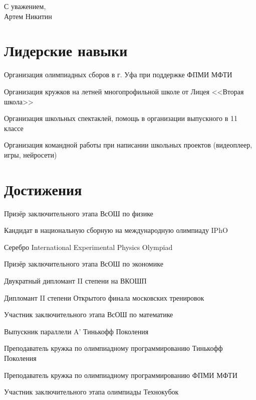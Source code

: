 \begin{flushright}
    С уважением, \\
    Артем Никитин
\end{flushright}


\section{\textbf{Лидерские навыки}}
\resumeSubHeadingListStart

\resumePOR
{}{Организация олимпиадных сборов в г. Уфа при поддержке ФПМИ МФТИ}{}

\resumePOR
{}{Организация кружков на летней многопрофильной школе от Лицея <<Вторая школа>>}{}

\resumePOR
{}{Организация школьных спектаклей, помощь в организации выпускного в 11 классе}{}

\resumePOR
{}{Организация командной работы при написании школьных проектов (видеоплеер, игры, нейросети)}{}

\resumeSubHeadingListEnd


\section{\textbf{Достижения}}
\resumeSubHeadingListStart

\resumePOR
{}{Призёр заключительного этапа ВсОШ по физике}{}

\resumePOR
{}{Кандидат в национальную сборную на международную олимпиаду IPhO}{}

\resumePOR
{}{Серебро International Experimental Physics Olympiad}{}

\resumePOR
{}{Призёр заключительного этапа ВсОШ по экономике}{}

\resumePOR
{}{Двукратный дипломант II степени на ВКОШП}{}

\resumePOR
{}{Дипломант II степени Открытого финала московских тренировок}{}

\resumePOR
{}{Участник заключительного этапа ВсОШ по математике}{}

\resumePOR
{}{Выпускник параллели A’ Тинькофф Поколения}{}

\resumePOR
{}{Преподаватель кружка по олимпиадному программированию Тинькофф Поколения}{}

\resumePOR
{}{Преподаватель кружка по олимпиадному программированию ФПМИ МФТИ}{}

\resumePOR
{}{Участник заключительного этапа олимпиады Технокубок}{}

